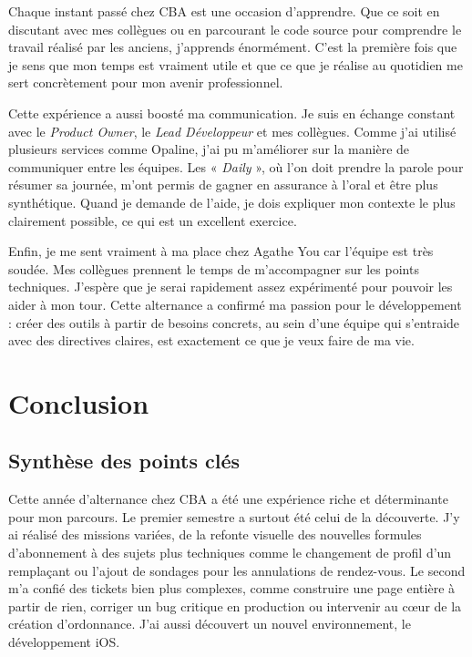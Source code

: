 \documentclass{article}
\begin{document}
Chaque instant passé chez CBA est une occasion d'apprendre. Que ce soit en discutant avec mes collègues ou en parcourant le code source pour comprendre le travail réalisé par les anciens, j'apprends énormément. C'est la première fois que je sens que mon temps est vraiment utile et que ce que je réalise au quotidien me sert concrètement pour mon avenir professionnel.

\newpage

Cette expérience a aussi boosté ma communication. Je suis en échange constant avec le \textit{Product Owner}, le \textit{Lead Développeur} et mes collègues. Comme j'ai utilisé plusieurs services comme Opaline, j'ai pu m'améliorer sur la manière de communiquer entre les équipes. Les « \textit{Daily} », où l'on doit prendre la parole pour résumer sa journée, m'ont permis de gagner en assurance à l'oral et être plus synthétique. Quand je demande de l'aide, je dois expliquer mon contexte le plus clairement possible, ce qui est un excellent exercice.

Enfin, je me sent vraiment à ma place chez Agathe You car l'équipe est très soudée. Mes collègues prennent le temps de m'accompagner sur les points techniques. J'espère que je serai rapidement assez expérimenté pour pouvoir les aider à mon tour. Cette alternance a confirmé ma passion pour le développement : créer des outils à partir de besoins concrets, au sein d'une équipe qui s'entraide avec des directives claires, est exactement ce que je veux faire de ma vie.

\section{Conclusion}

\subsection{Synthèse des points clés}

Cette année d'alternance chez CBA a été une expérience riche et déterminante pour mon parcours. Le premier semestre a surtout été celui de la découverte. J'y ai réalisé des missions variées, de la refonte visuelle des nouvelles formules d'abonnement à des sujets plus techniques comme le changement de profil d'un remplaçant ou l'ajout de sondages pour les annulations de rendez-vous. Le second m'a confié des tickets bien plus complexes, comme construire une page entière à partir de rien, corriger un bug critique en production ou intervenir au cœur de la création d'ordonnance. J'ai aussi découvert un nouvel environnement, le développement iOS.
\end{document}
